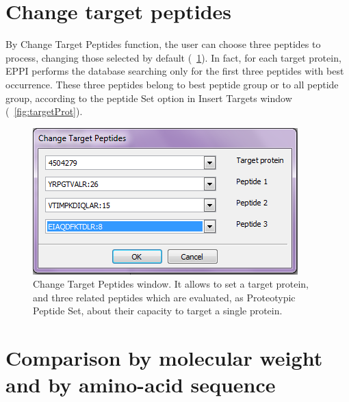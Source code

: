 \documentclass[a4paper,14pt]{extarticle}
\begin{document}
\section{Change target peptides}
By Change Target Peptides function, the user can choose three peptides to process, changing those selected by default (\figurename~\ref{fig:change}). In fact, for each target protein, EPPI performs the database searching only for the first three peptides with best occurrence. These three peptides belong to best peptide group or to all peptide group, according to the peptide Set option in Insert Targets window (\figurename~\ref{fig:targetProt}).


\begin{figure}[htbp]
\begin{center}
\includegraphics[scale=0.5]{Eppi_change_targets_peptides}
\caption{Change Target Peptides window. It allows to set a target protein, and three related peptides which are evaluated, as Proteotypic Peptide Set, about their capacity to target a single protein.}\label{fig:change}
\end{center}
\end{figure}

\section{Comparison by molecular weight and by amino-acid sequence}
\end{document}
